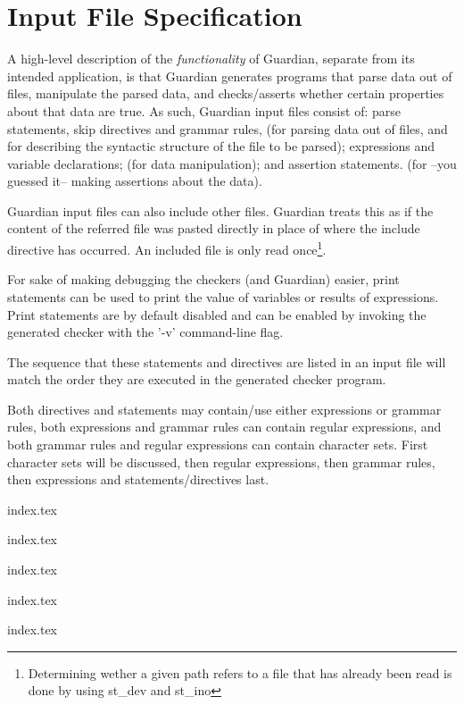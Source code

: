 
\chapter{Input File Specification}
{
	A high-level description of the \textit{functionality} of Guardian, separate
	from its intended application, is that Guardian generates programs that
	parse data out of files, manipulate the parsed data, and checks/asserts whether
	certain properties about that data are true. As such, Guardian input files
	consist of: parse statements, skip directives and grammar rules, (for
	parsing data out of files, and for describing the syntactic structure of
	the file to be parsed); expressions and variable declarations; (for data
	manipulation); and assertion statements. (for --you guessed it-- making
	assertions about the data).
	
	Guardian input files can also include other files. Guardian treats this as
	if the content of the referred file was pasted directly in place of where
	the include directive has occurred. An included file is only read
	once\footnote{Determining wether a given path refers to a file that has
	already been read is done by using st\_dev and st\_ino}.
	
	For sake of making debugging the checkers (and Guardian) easier, print
	statements can be used to print the value of variables or
	results of expressions. Print statements are by default disabled and can be
	enabled by invoking the generated checker with the '-v' command-line flag.
	
	The sequence that these statements and directives are listed in an input
	file will match the
	order they are executed in the generated checker program.
	
	Both directives and statements may contain/use either expressions or grammar
	rules, both expressions and grammar rules can contain regular expressions,
	and both grammar rules and regular expressions can contain character sets.
	First character sets will be discussed, then regular expressions, then
	grammar rules, then expressions and statements/directives last.
	
	{index.tex}
	
	{index.tex}
	
	{index.tex}
	
	{index.tex}
	
	{index.tex}
}










